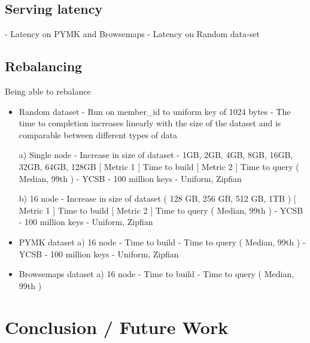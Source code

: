 \documentclass[10pt,twocolumn,preprint,natbib,authoryear]{sigplanconf}
\begin{document}

\subsection{Serving latency}
\label{sec:benchmark:serving_latency}

- Latency on PYMK and Browsemaps
- Latency on Random data-set



\subsection{Rebalancing}
\label{sec:benchmark:rebalancing}
Being able to rebalance

\begin{itemize}
	\item Random dataset
- Run on member\_id to uniform key of 1024 bytes
- The time to completion increases linearly with the size of the dataset and is comparable between different types of data

a) Single node - Increase in size of dataset - 1GB, 2GB, 4GB, 8GB, 16GB, 32GB, 64GB, 128GB 
       [ Metric 1 ] Time to build
       [ Metric 2 ] Time to query ( Median, 99th ) - YCSB - 100 million keys - Uniform, Zipfian 

b) 16 node - Increase in size of dataset ( 128 GB, 256 GB, 512 GB, 1TB )
      [ Metric 1 ] Time to build
      [ Metric 2 ] Time to query ( Median, 99th ) - YCSB - 100 million keys - Uniform, Zipfian 

	\item PYMK dataset
	a) 16 node 
       - Time to build
       - Time to query ( Median, 99th ) - YCSB - 100 million keys - Uniform, Zipfian 

	\item Browsemaps dataset
	a) 16 node
	   - Time to build
	   - Time to query ( Median, 99th )
\end{itemize}



\section{Conclusion / Future Work}
\label{sec:conclusion}
\end{document}
